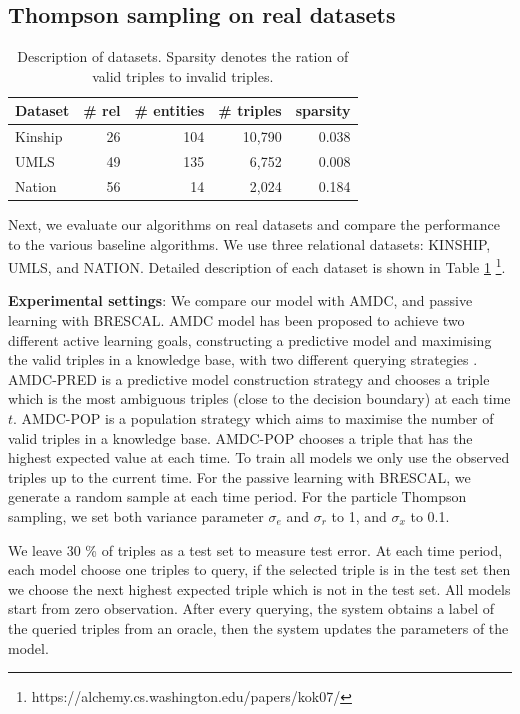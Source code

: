 \subsection{Thompson sampling on real datasets}
\begin{table}[t]
\centering
\caption{\label{tbl:dataset}Description of datasets. 
Sparsity denotes the ration of valid triples to invalid triples.}
\vskip 0.15in
\begin{tabular}{l | r | r | r | r}
Dataset &  \# rel & \# entities & \# triples & sparsity \\ \hline
Kinship & 26 & 104  & 10,790 & 0.038 \\
UMLS & 49 &135  & 6,752 & 0.008 \\
Nation & 56 & 14  & 2,024 & 0.184 \\
\end{tabular}
\end{table}

Next, we evaluate our algorithms on real datasets and compare the performance to the various baseline 
algorithms. We use three relational datasets: KINSHIP, UMLS, and NATION. Detailed description of each 
dataset is shown in Table \ref{tbl:dataset} \footnote{https://alchemy.cs.washington.edu/papers/kok07/}.

\textbf{Experimental settings}: 
We compare our model with AMDC, and passive learning with BRESCAL.  
AMDC model has been proposed to achieve two different active learning goals, constructing a predictive
model and maximising the valid triples in a knowledge base, with two different querying strategies
 \cite{kajino2015active}. 
AMDC-PRED is a predictive model construction strategy and chooses a triple which is the most ambiguous triples (close to the decision boundary) at each time $t$.
AMDC-POP is a population strategy which aims to maximise the number of valid triples in a knowledge base. AMDC-POP chooses a triple that has the highest expected value at each time.  
To train all models we only use the observed triples up to the current time. For the passive learning with BRESCAL, we generate a random sample at each time period.
For the particle Thompson sampling, we set both variance parameter $\sigma_e$ and $\sigma_r$ to 1, and $
\sigma_x$ to 0.1. 

We leave 30 \% of triples as a test set to measure test error. 
At each time period, each model choose one triples to query, 
if the selected triple is in the test set then we choose the next highest expected triple which is not in the test set.
All models start from zero observation. 
After every querying, the system obtains a label of the queried triples from an oracle,
then the system updates the parameters of the model. 

